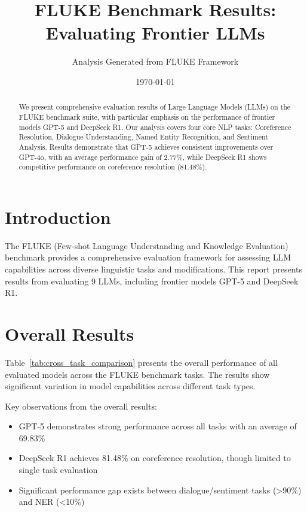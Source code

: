 \documentclass[11pt]{article}
\title{FLUKE Benchmark Results: Evaluating Frontier LLMs}
\author{Analysis Generated from FLUKE Framework}
\date{\today}
\begin{document}
\maketitle

\begin{abstract}
We present comprehensive evaluation results of Large Language Models (LLMs) on the FLUKE benchmark suite, 
with particular emphasis on the performance of frontier models GPT-5 and DeepSeek R1. Our analysis covers 
four core NLP tasks: Coreference Resolution, Dialogue Understanding, Named Entity Recognition, and Sentiment 
Analysis. Results demonstrate that GPT-5 achieves consistent improvements over GPT-4o, with an average 
performance gain of 2.77\%, while DeepSeek R1 shows competitive performance on coreference resolution (81.48\%).
\end{abstract}

\section{Introduction}

The FLUKE (Few-shot Language Understanding and Knowledge Evaluation) benchmark provides a comprehensive 
evaluation framework for assessing LLM capabilities across diverse linguistic tasks and modifications. 
This report presents results from evaluating 9 LLMs, including frontier models GPT-5 and DeepSeek R1.

\section{Overall Results}

Table~\ref{tab:cross_task_comparison} presents the overall performance of all evaluated models across 
the FLUKE benchmark tasks. The results show significant variation in model capabilities across different 
task types.



Key observations from the overall results:
\begin{itemize}
    \item GPT-5 demonstrates strong performance across all tasks with an average of 69.83\%
    \item DeepSeek R1 achieves 81.48\% on coreference resolution, though limited to single task evaluation
    \item Significant performance gap exists between dialogue/sentiment tasks (>90\%) and NER (<10\%)
\end{itemize}
\end{document}

